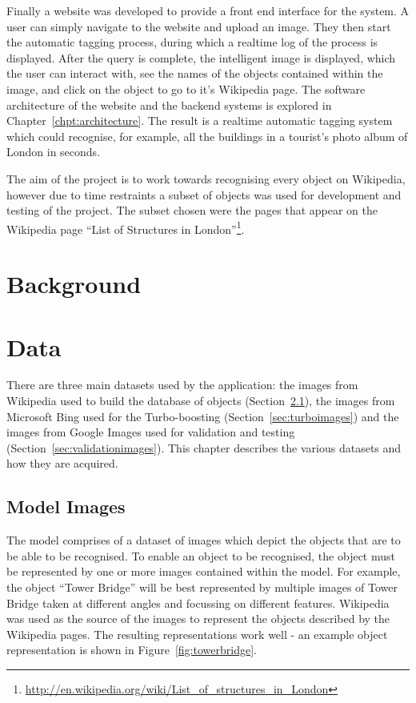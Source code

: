 \documentclass[11pt, onecolumn, a4paper, final]{report} %
\begin{document}
Finally a website was developed to provide a front end interface for the system. A user can simply navigate to the website and upload an image. They then start the automatic tagging process, during which a realtime log of the process is displayed. After the query is complete, the intelligent image is displayed, which the user can interact with, see the names of the objects contained within the image, and click on the object to go to it's Wikipedia page. The software architecture of the website and the backend systems is explored in Chapter~\ref{chpt:architecture}. The result is a realtime automatic tagging system which could recognise, for example, all the buildings in a tourist's photo album of London in seconds.

The aim of the project is to work towards recognising every object on Wikipedia, however due to time restraints a subset of objects was used for development and testing of the project. The subset chosen were the pages that appear on the Wikipedia page ``List of Structures in London''\footnote{\url{http://en.wikipedia.org/wiki/List_of_structures_in_London}}.
	

\chapter{Background}
\label{chpt:background}


\chapter{Data}
\label{chpt:data}
There are three main datasets used by the application: the images from Wikipedia used to build the database of objects (Section~\ref{sec:modelimages}), the images from Microsoft Bing used for the Turbo-boosting (Section~\ref{sec:turboimages}) and the images from Google Images used for validation and testing (Section~\ref{sec:validationimages}). This chapter describes the various datasets and how they are acquired.

\section{Model Images}
\label{sec:modelimages}
The model comprises of a dataset of images which depict the objects that are to be able to be recognised. To enable an object to be recognised, the object must be represented by one or more images contained within the model. For example, the object ``Tower Bridge'' will be best represented by multiple images of Tower Bridge taken at different angles and focussing on different features. Wikipedia was used as the source of the images to represent the objects described by the Wikipedia pages. The resulting representations work well - an example object representation is shown in Figure~\ref{fig:towerbridge}.
\end{document}

